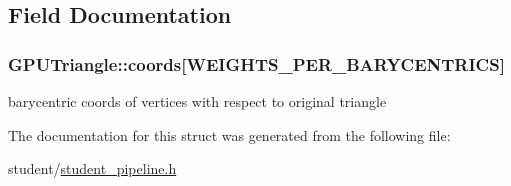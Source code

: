 \subsection{Field Documentation}
\hypertarget{structGPUTriangle_a1cd3fe2c1979f844528481ee336d4e09}{
\subsubsection[{coords}]{ G\-P\-U\-Triangle\-::coords\mbox{[}{\bf W\-E\-I\-G\-H\-T\-S\-\_\-\-P\-E\-R\-\_\-\-B\-A\-R\-Y\-C\-E\-N\-T\-R\-I\-C\-S}\mbox{]}}}\label{structGPUTriangle_a1cd3fe2c1979f844528481ee336d4e09}
barycentric coords of vertices with respect to original triangle 

The documentation for this struct was generated from the following file\-:\begin{DoxyCompactItemize}
\item 
student/\hyperlink{student__pipeline_8h}{student\-\_\-pipeline.\-h}\end{DoxyCompactItemize}
